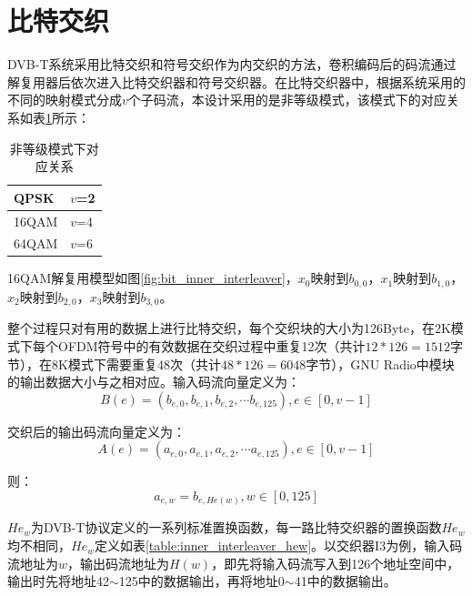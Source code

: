 	\section{比特交织}
		\par DVB-T系统采用比特交织和符号交织作为内交织的方法，卷积编码后的码流通过解复用器后依次进入比特交织器和符号交织器。在比特交织器中，根据系统采用的不同的映射模式分成$v$个子码流，本设计采用的是非等级模式，该模式下的对应关系如表\ref{table:bit_inner_interleaver_v}所示：
		\begin{table}[!htbp]
			\centering
			\caption{非等级模式下对应关系}
			\begin{tabular*}{5cm}{l|l}
				\hline\hline
				QPSK & $v$=2 \\
				\hline
				16QAM & $v$=4 \\
				\hline
				64QAM & $v$=6 \\
				\hline\hline
			\end{tabular*}
			\label{table:bit_inner_interleaver_v}
		\end{table}
		\par 16QAM解复用模型如图\ref{fig:bit_inner_interleaver}，$x_0$映射到$b_{0,0}$，$x_1$映射到$b_{1,0}$，$x_2$映射到$b_{2,0}$，$x_3$映射到$b_{3,0}$。
		
		\par 整个过程只对有用的数据上进行比特交织，每个交织块的大小为126Byte，在2K模式下每个OFDM符号中的有效数据在交织过程中重复12次（共计$12*126=1512$字节），在8K模式下需要重复48次（共计$48*126=6048$字节），GNU Radio中模块的输出数据大小与之相对应。输入码流向量定义为：
		\begin{equation}
			B(e)=(b_{e,0},b_{e,1},b_{e,2},\cdots b_{e,125}),e\in[0,v-1]
		\end{equation}
		\par 交织后的输出码流向量定义为：
		\begin{equation}
			A(e)=(a_{e,0},a_{e,1},a_{e,2},\cdots a_{e,125}),e\in[0,v-1]
		\end{equation}
		\par 则：
		\begin{equation}
			a_{e,w}=b_{e,He(w)},w\in[0,125]
		\end{equation}
		\par $He_{w}$为DVB-T协议定义的一系列标准置换函数，每一路比特交织器的置换函数$He_{w}$均不相同，$He_{w}$定义如表\ref{table:inner_interleaver_hew}。以交织器I3为例，输入码流地址为$w$，输出码流地址为$H(w)$，即先将输入码流写入到126个地址空间中，输出时先将地址42$\sim$125中的数据输出，再将地址0$\sim$41中的数据输出。
